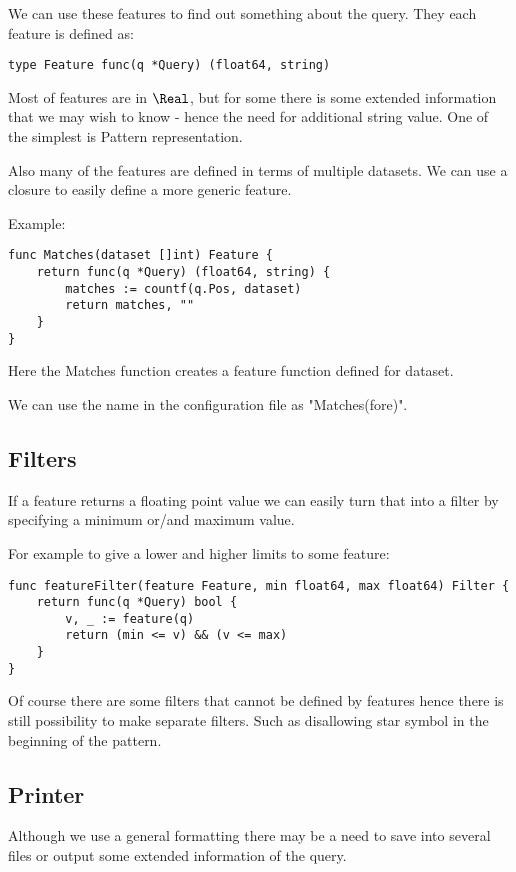 We can use these features to find out something about the query.
They each feature is defined as:

\begin{verbatim}
type Feature func(q *Query) (float64, string)
\end{verbatim}

Most of features are in $\Real$, but for some there
is some extended information that we may wish to know - hence
the need for additional string value. One of the simplest
is Pattern representation.

Also many of the features are defined in terms of multiple datasets.
We can use a closure to easily define a more generic feature.

Example:

\begin{verbatim}
func Matches(dataset []int) Feature {
	return func(q *Query) (float64, string) {
		matches := countf(q.Pos, dataset)
		return matches, ""
	}
}
\end{verbatim}

Here the Matches function creates a feature function defined
for dataset.

We can use the name in the configuration file as "Matches(fore)".

\subsection{Filters}

If a feature returns a floating point value we can easily turn that
into a filter by specifying a minimum or/and maximum value.

For example to give a lower and higher limits to some feature:

\begin{verbatim}
func featureFilter(feature Feature, min float64, max float64) Filter {
	return func(q *Query) bool {
		v, _ := feature(q)
		return (min <= v) && (v <= max)
	}
}
\end{verbatim}

Of course there are some filters that cannot be defined by features hence
there is still possibility to make separate filters. Such as disallowing
star symbol in the beginning of the pattern.

\subsection{Printer}

Although we use a general formatting there may be a need to save into
several files or output some extended information of the query.

